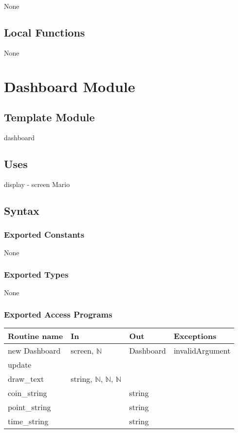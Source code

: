 \documentclass[12pt]{article}
\begin{document}
None

\subsection* {Local Functions}

None

\newpage

\section* {Dashboard Module}

\subsection*{Template Module}

dashboard

\subsection {Uses}

display - screen
Mario

\subsection* {Syntax}

\subsubsection *{Exported Constants}

None

\subsubsection* {Exported Types}

None

\subsubsection* {Exported Access Programs}

\begin{tabular}{| l | l | l | l |}
\hline
\textbf{Routine name} & \textbf{In} & \textbf{Out} & \textbf{Exceptions}\\
\hline
new Dashboard & screen, $\mathbb{N}$ & Dashboard & invalidArgument\\
\hline
update & & & \\
\hline
draw\_text & string, $\mathbb{N}$, $\mathbb{N}$, $\mathbb{N}$ & & \\
\hline
coin\_string & & string & \\
\hline
point\_string & & string & \\
\hline
time\_string & & string & \\
\hline
\end{tabular}
\end{document}
